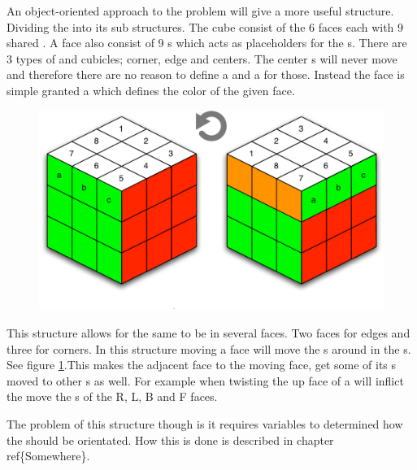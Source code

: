 An object-oriented approach to the problem will give a more useful structure. 
Dividing the \rubik{} into its sub structures. 
The cube consist of the 6 faces each with 9 shared \cpiece{}. 
A face also consist of 9 \cubicle{}s which acts as placeholders for the \cpiece{}s. 
There are 3 types of \cpiece{} and cubicles; corner, edge and centers. 
The center \cpiece{}s will never move and therefore there are no reason to define a \cubicle{} and a \cpiece{} for those. Instead the face is simple granted a \facelet{} which defines the color of the given face.
\begin{figure}[h]
	\centering
		\includegraphics[scale=0.6]{input/pics/twistOfUpFace.pdf}
	\caption{}
	\label{fig:twistOfUpFace}
\end{figure}
This structure allows for the same \cubicle{} to be in several faces. 
Two faces for edges and three for corners. 
In this structure moving a face will move the \cpiece{}s around in the \cubicle{}s. See figure \ref{fig:twistOfUpFace}.This makes the adjacent face to the moving face, get some of its \cpiece{}s moved to other \cubicle{}s as well. 
For example when twisting the up face of a \rubik{} will inflict the move the \cpiece{}s of the R, L, B and F faces. 

The problem of this structure though is it requires variables to determined how the \facelet{} should be orientated. 
How this is done is described in chapter ref\{Somewhere\}.
